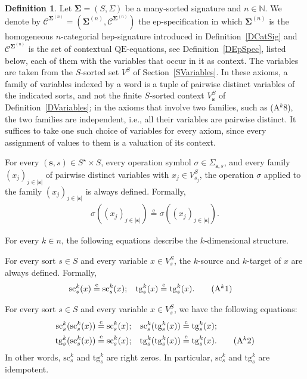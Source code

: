\documentclass[a4paper, reqno]{amsbook}
\newcommand{\sig}[1]{\mathbf{#1}}             %
\newcommand{\spec}[1]{\boldsymbol{\mathcal{#1}}} %
\newcommand{\eeq}{\overset{\mathrm e}{=}}      %
\newcommand{\QE}{\mathrm{QE}}
\newcommand{\src}{\mathrm{sc}}
\newcommand{\tgt}{\mathrm{tg}}
\theoremstyle{plain}
\theoremstyle{definition}
\newtheorem{definition}[theorem]{Definition}
\begin{document}
\begin{definition}\label{DCatSpec}
Let $\sig{\Sigma}=(S,\Sigma)$ be a many-sorted signature and $n\in\mathbb{N}$.
We denote by $\spec{C}^{\sig{\Sigma}^{(n)}}=(\sig{\Sigma}^{(n)},\mathcal{C}^{\sig{\Sigma}^{(n)}})$ the ep-specification in which $\sig{\Sigma}^{(n)}$ is the homogeneous $n$-categorial hep-signature introduced in Definition~\ref{DCatSig} and $\mathcal{C}^{\sig{\Sigma}^{(n)}}$ is the set of contextual $\QE$-equations, see Definition~\ref{DEpSpec}, listed below, each of them with the variables that occur in it as context.
The variables are taken from the $S$-sorted set $V^{S}$ of Section~\ref{SVariables}.
In these axioms, a family of variables indexed by a word is a tuple of pairwise distinct variables of the indicated sorts, and not the finite $S$-sorted context $V^{S}_{\mathbf{s}}$ of Definition~\ref{DVariables}; in the axioms that involve two families, such as (A$^{k}$8), the two families are independent, i.e., all their variables are pairwise distinct.
It suffices to take one such choice of variables for every axiom, since every assignment of values to them is a valuation of its context.

For every $(\mathbf{s},s)\in S^{\star}\times S$, every operation symbol $\sigma\in \Sigma_{\mathbf{s},s}$, and every family $(x_{j})_{j\in \lvert\mathbf{s}\rvert}$ of pairwise distinct variables with $x_{j}\in V^{S}_{s_{j}}$, the operation $\sigma$ applied to the family $(x_{j})_{j\in \lvert\mathbf{s}\rvert}$ is always defined.
Formally,
\begin{align*}
\sigma((x_{j})_{j\in \lvert\mathbf{s}\rvert})\eeq\sigma((x_{j})_{j\in \lvert\mathbf{s}\rvert}).\label{ACatA0}\tag{A0}
\end{align*}

For every $k\in n$, the following equations describe the $k$-dimensional structure.

For every sort $s\in S$ and every variable $x\in V^{S}_{s}$, the $k$-source and $k$-target of $x$ are always defined.
Formally,
\begin{align*}
\src^{k}_{s}(x)&\eeq\src^{k}_{s}(x);
&
\tgt^{k}_{s}(x)&\eeq\tgt^{k}_{s}(x).\label{ACatAk1}\tag{A$^{k}$1}
\end{align*}

For every sort $s\in S$ and every variable $x\in V^{S}_{s}$, we have the following equations:
\begin{align*}
\src^{k}_{s}(\src^{k}_{s}(x))&\eeq\src^{k}_{s}(x);
&
\src^{k}_{s}(\tgt^{k}_{s}(x))&\eeq\tgt^{k}_{s}(x);\\
\tgt^{k}_{s}(\src^{k}_{s}(x))&\eeq\src^{k}_{s}(x);
&
\tgt^{k}_{s}(\tgt^{k}_{s}(x))&\eeq\tgt^{k}_{s}(x).\label{ACatAk2}\tag{A$^{k}$2}
\end{align*}
In other words, $\src^{k}_{s}$ and $\tgt^{k}_{s}$ are right zeros.
In particular, $\src^{k}_{s}$ and $\tgt^{k}_{s}$ are idempotent.


\end{definition}
\end{document}
